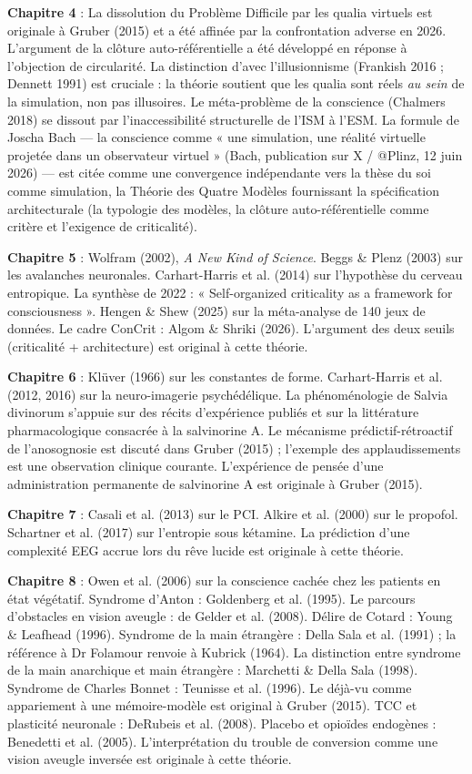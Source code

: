 \documentclass[11pt, twoside, openright]{book}
\begin{document}
\textbf{Chapitre 4} : La dissolution du Problème Difficile par les qualia virtuels est originale à Gruber (2015) et a été affinée par la confrontation adverse en 2026. L'argument de la clôture auto-référentielle a été développé en réponse à l'objection de circularité. La distinction d'avec l'illusionnisme (Frankish 2016 ; Dennett 1991) est cruciale : la théorie soutient que les qualia sont réels \textit{au sein} de la simulation, non pas illusoires. Le méta-problème de la conscience (Chalmers 2018) se dissout par l'inaccessibilité structurelle de l'ISM à l'ESM. La formule de Joscha Bach --- la conscience comme « une simulation, une réalité virtuelle projetée dans un observateur virtuel » (Bach, publication sur X / @Plinz, 12 juin 2026) --- est citée comme une convergence indépendante vers la thèse du soi comme simulation, la Théorie des Quatre Modèles fournissant la spécification architecturale (la typologie des modèles, la clôture auto-référentielle comme critère et l'exigence de criticalité).

\textbf{Chapitre 5} : Wolfram (2002), \textit{A New Kind of Science}. Beggs \& Plenz (2003) sur les avalanches neuronales. Carhart-Harris et al. (2014) sur l'hypothèse du cerveau entropique. La synthèse de 2022 : « Self-organized criticality as a framework for consciousness ». Hengen \& Shew (2025) sur la méta-analyse de 140 jeux de données. Le cadre ConCrit : Algom \& Shriki (2026). L'argument des deux seuils (criticalité + architecture) est original à cette théorie.

\textbf{Chapitre 6} : Klüver (1966) sur les constantes de forme. Carhart-Harris et al. (2012, 2016) sur la neuro-imagerie psychédélique. La phénoménologie de Salvia divinorum s'appuie sur des récits d'expérience publiés et sur la littérature pharmacologique consacrée à la salvinorine A. Le mécanisme prédictif-rétroactif de l'anosognosie est discuté dans Gruber (2015) ; l'exemple des applaudissements est une observation clinique courante. L'expérience de pensée d'une administration permanente de salvinorine A est originale à Gruber (2015).

\textbf{Chapitre 7} : Casali et al. (2013) sur le PCI. Alkire et al. (2000) sur le propofol. Schartner et al. (2017) sur l'entropie sous kétamine. La prédiction d'une complexité EEG accrue lors du rêve lucide est originale à cette théorie.

\textbf{Chapitre 8} : Owen et al. (2006) sur la conscience cachée chez les patients en état végétatif. Syndrome d'Anton : Goldenberg et al. (1995). Le parcours d'obstacles en vision aveugle : de Gelder et al. (2008). Délire de Cotard : Young \& Leafhead (1996). Syndrome de la main étrangère : Della Sala et al. (1991) ; la référence à Dr Folamour renvoie à Kubrick (1964). La distinction entre syndrome de la main anarchique et main étrangère : Marchetti \& Della Sala (1998). Syndrome de Charles Bonnet : Teunisse et al. (1996). Le déjà-vu comme appariement à une mémoire-modèle est original à Gruber (2015). TCC et plasticité neuronale : DeRubeis et al. (2008). Placebo et opioïdes endogènes : Benedetti et al. (2005). L'interprétation du trouble de conversion comme une vision aveugle inversée est originale à cette théorie.
\end{document}
